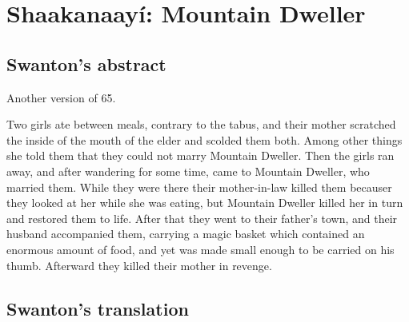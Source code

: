 
\resetexcnt
\chapter{Shaakanaayí: Mountain Dweller}\label{ch:92-mountain-dweller}


\section{Swanton’s abstract}\label{sec:92-swanton-abstract}

Another version of 65.

Two girls ate between meals, contrary to the tabus, and their mother scratched the inside of the mouth of the elder and scolded them both.
Among other things she told them that they could not marry Mountain Dweller.
Then the girls ran away, and after wandering for some time, came to Mountain Dweller, who married them.
While they were there their mother-in-law killed them becauser they looked at her while she was eating, but Mountain Dweller killed her in turn and restored them to life.
After that they went to their father’s town, and their husband accompanied them, carrying a magic basket which contained an enormous amount of food, and yet was made small enough to be carried on his thumb.
Afterward they killed their mother in revenge.

\section{Swanton’s translation}\label{sec:92-swanton-translation}

